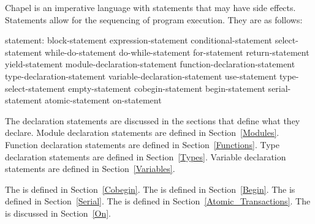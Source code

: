 
Chapel is an imperative language with statements that may have side
effects.  Statements allow for the sequencing of program execution.
They are as follows:
\begin{syntax}
statement:
  block-statement
  expression-statement
  conditional-statement
  select-statement
  while-do-statement
  do-while-statement
  for-statement
  return-statement
  yield-statement
  module-declaration-statement
  function-declaration-statement
  type-declaration-statement
  variable-declaration-statement
  use-statement
  type-select-statement
  empty-statement
  cobegin-statement
  begin-statement
  serial-statement
  atomic-statement
  on-statement
\end{syntax}

The declaration statements are discussed in the sections that define
what they declare.  Module declaration statements are defined in
Section~\ref{Modules}.  Function declaration statements are defined in
Section~\ref{Functions}.  Type declaration statements are defined in
Section~\ref{Types}.  Variable declaration statements are defined in
Section~\ref{Variables}.

The  is defined in Section~\ref{Cobegin}.
The  is defined in Section~\ref{Begin}.
The  is defined in Section~\ref{Serial}.
The  is defined in
Section~\ref{Atomic_Transactions}.  The  is
discussed in Section~\ref{On}.
